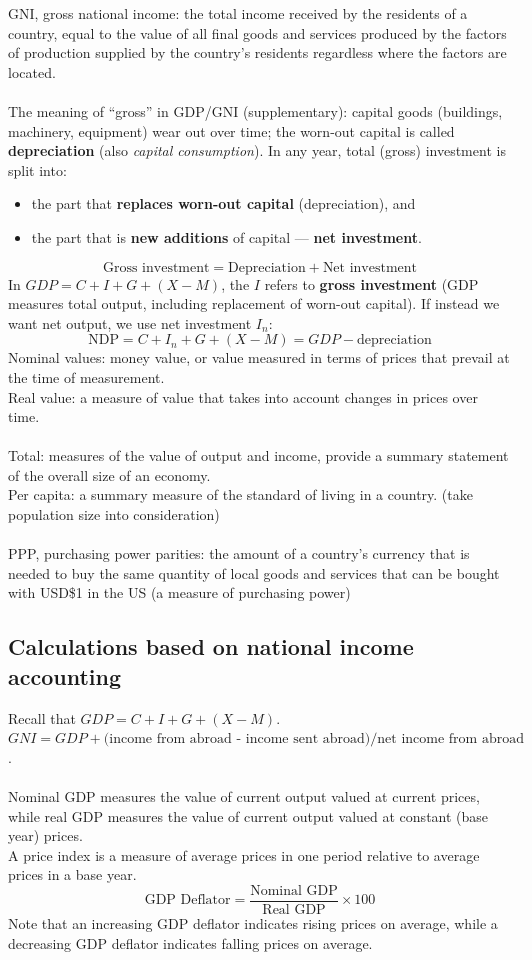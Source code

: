 \documentclass[a4paper,12pt]{article}
\newcommand{\needbold}[1]{\textcolor{red!70!black}{\textbf{#1}}}
\begin{document}
GNI, gross national income: the total income received by the residents of a country, equal to the value of all final goods and services produced by the factors of production supplied by the country's residents regardless where the factors are located.\\\\
The meaning of ``gross'' in GDP/GNI (supplementary): capital goods (buildings, machinery, equipment) wear out over time; the worn-out capital is called \needbold{depreciation} (also \textit{capital consumption}). In any year, total (gross) investment is split into:
\begin{itemize}
  \item the part that \textbf{replaces worn-out capital} (depreciation), and
  \item the part that is \textbf{new additions} of capital --- \needbold{net investment}.
\end{itemize}
\[\text{Gross investment} = \text{Depreciation} + \text{Net investment}\]
In $GDP = C + I + G + (X - M)$, the $I$ refers to \textbf{gross investment} (GDP measures total output, including replacement of worn-out capital). If instead we want net output, we use net investment $I_n$:
\[\text{NDP} = C + I_n + G + (X - M) = GDP - \text{depreciation}\]
Nominal values: money value, or value measured in terms of prices that prevail at the time of measurement. \\
Real value: a measure of value that takes into account changes in prices over time.\\\\
Total: measures of the value of output and income, provide a summary statement of the overall size of an economy.\\
Per capita: a summary measure of the standard of living in a country. (take population size into consideration)\\\\
PPP, purchasing power parities: the amount of a country's currency that is needed to buy the same quantity of local goods and services that can be bought with USD\$1 in the US (a measure of purchasing power)
\subsection{Calculations based on national income accounting}
Recall that $GDP=C+I+G+(X-M)$. \\
$GNI=GDP + \text{(income from abroad - income sent abroad)} / \text{net income from abroad}$.\\\\
Nominal GDP measures the value of current output valued at current prices, while real GDP measures the value of current output valued at constant (base year) prices.\\
A price index is a measure of average prices in one period relative to average prices in a base year.
\[\text{GDP Deflator}=\dfrac{\text{Nominal GDP}}{\text{Real GDP}}\times 100\]
Note that an increasing GDP deflator indicates rising prices on average, while a decreasing GDP deflator indicates falling prices on average.
\end{document}
